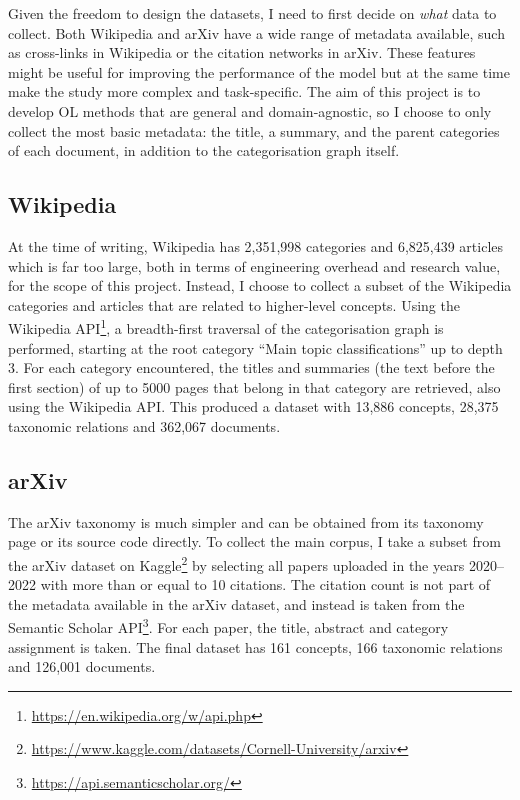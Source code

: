Given the freedom to design the datasets, I need to first decide on \emph{what} data to collect. Both Wikipedia and arXiv have a wide range of metadata available, such as cross-links in Wikipedia or the citation networks in arXiv. These features might be useful for improving the performance of the model but at the same time make the study more complex and task-specific. The aim of this project is to develop OL methods that are general and domain-agnostic, so I choose to only collect the most basic metadata: the title, a summary, and the parent categories of each document, in addition to the categorisation graph itself.

\subsection{Wikipedia}

At the time of writing, Wikipedia has 2,351,998 categories and 6,825,439 articles which is far too large, both in terms of engineering overhead and research value, for the scope of this project. Instead, I choose to collect a subset of the Wikipedia categories and articles that are related to higher-level concepts. Using the Wikipedia API\footnote{\url{https://en.wikipedia.org/w/api.php}}, a breadth-first traversal of the categorisation graph is performed, starting at the root category ``Main topic classifications'' up to depth 3. For each category encountered, the titles and summaries (the text before the first section) of up to 5000 pages that belong in that category are retrieved, also using the Wikipedia API. This produced a dataset with 13,886 concepts, 28,375 taxonomic relations and 362,067 documents.

\subsection{arXiv}

The arXiv taxonomy is much simpler and can be obtained from its taxonomy page or its source code directly. To collect the main corpus, I take a subset from the arXiv dataset on Kaggle\footnote{\url{https://www.kaggle.com/datasets/Cornell-University/arxiv}} by selecting all papers uploaded in the years 2020--2022 with more than or equal to 10 citations. The citation count is not part of the metadata available in the arXiv dataset, and instead is taken from the Semantic Scholar API\footnote{\url{https://api.semanticscholar.org/}}. For each paper, the title, abstract and category assignment is taken. The final dataset has 161 concepts, 166 taxonomic relations and 126,001 documents.


